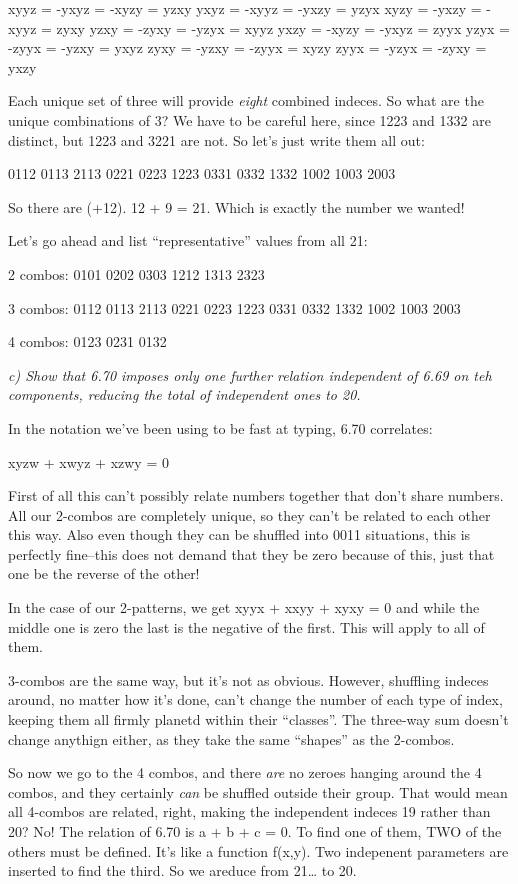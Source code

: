 \documentclass[landscape,letterpaper,10pt,english]{article}
\begin{document}
xyyz = -yxyz = -xyzy = yzxy yxyz = -xyyz = -yxzy = yzyx xyzy = -yxzy =
-xyyz = zyxy yzxy = -zyxy = -yzyx = xyyz yxzy = -xyzy = -yxyz = zyyx
yzyx = -zyyx = -yzxy = yxyz zyxy = -yzxy = -zyyx = xyzy zyyx = -yzyx =
-zyxy = yxzy

Each unique set of three will provide \emph{eight} combined indeces. So
what are the unique combinations of 3? We have to be careful here, since
1223 and 1332 are distinct, but 1223 and 3221 are not. So let's just
write them all out:

0112 0113 2113 0221 0223 1223 0331 0332 1332 1002 1003 2003

So there are (+12). 12 + 9 = 21. Which is exactly the number we wanted!

Let's go ahead and list ``representative'' values from all 21:

2 combos: 0101 0202 0303 1212 1313 2323

3 combos: 0112 0113 2113 0221 0223 1223 0331 0332 1332 1002 1003 2003

4 combos: 0123 0231 0132

    \emph{c) Show that 6.70 imposes only one further relation independent of
6.69 on teh components, reducing the total of independent ones to 20.}

In the notation we've been using to be fast at typing, 6.70 correlates:

xyzw + xwyz + xzwy = 0

First of all this can't possibly relate numbers together that don't
share numbers. All our 2-combos are completely unique, so they can't be
related to each other this way. Also even though they can be shuffled
into 0011 situations, this is perfectly fine--this does not demand that
they be zero because of this, just that one be the reverse of the other!

In the case of our 2-patterns, we get xyyx + xxyy + xyxy = 0 and while
the middle one is zero the last is the negative of the first. This will
apply to all of them.

3-combos are the same way, but it's not as obvious. However, shuffling
indeces around, no matter how it's done, can't change the number of each
type of index, keeping them all firmly planetd within their ``classes''.
The three-way sum doesn't change anythign either, as they take the same
``shapes'' as the 2-combos.

So now we go to the 4 combos, and there \emph{are} no zeroes hanging
around the 4 combos, and they certainly \emph{can} be shuffled outside
their group. That would mean all 4-combos are related, right, making the
independent indeces 19 rather than 20? No! The relation of 6.70 is a + b
+ c = 0. To find one of them, TWO of the others must be defined. It's
like a function f(x,y). Two indepenent parameters are inserted to find
the third. So we areduce from 21\ldots{} to 20.
\end{document}
